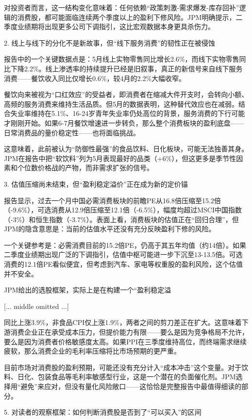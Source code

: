\documentclass[11pt]{ctexart}
\begin{document}
对投资者而言，这一结构变化意味着：任何依赖“政策刺激-需求爆发-库存回补”逻辑的消费股，都可能面临连续两个季度以上的盈利下修风险。JPM明确提示，二季度业绩期将出现更多公司下调指引，这比宏观数据本身更具杀伤力。

2. 线上与线下的分化不是新故事，但“线下服务消费”的韧性正在被侵蚀

报告中的一个关键数据点是：5月线上实物零售同比增长2.6\%，而线下实物零售同比下降2.2\%。线上渗透率的持续提升已经是旧叙事，真正的新信号来自线下服务消费——餐饮收入同比仅增长0.6\%，较4月的2.2\%大幅收窄。

餐饮向来被视为“口红效应”的受益者，即消费者在缩减大件开支时，会转向小额、高频的服务消费来维持生活品质。但5月的数据表明，这种替代效应也在减弱。结合失业率维持在5.1\%、16-24岁青年失业率仍处高位的背景，服务消费的下行可能才刚刚开始。如果6-7月餐饮增速进一步转负，那么整个消费板块的盈利底盘——日常消费品的量价稳定性——也将面临挑战。

这意味着，此前被认为“防御性最强”的食品饮料、日化板块，可能无法独善其身。JPM在报告中把“软饮料”列为5月表现最好的品类（+6\%），但这更多是季节性因素和个位数价格战的产物，而非需求扩张的信号。

3. 估值压缩尚未结束，但“盈利稳定溢价”正在成为新的定价锚

报告显示，过去一个月中国必需消费板块的前瞻PE从16.8倍压缩至15.2倍（-9.6\%），可选消费从12.9倍压缩至12.1倍（-6.5\%），幅度均超过MSCI中国指数（-3\%）和恒生指数（-3.7\%）。表面上看，消费板块的估值正在“回归合理”，但JPM的隐含意思是：当前的估值水平还没有充分反映盈利下修的风险。

一个关键参考是：必需消费目前的15.2倍PE，仍高于其五年均值（约14倍）。如果二季度业绩期出现广泛的下调指引，估值中枢可能进一步下沉至13-13.5倍。可选消费的12.1倍PE看似便宜，但考虑到汽车、家电等权重股的盈利风险，这个估值并不安全。

JPM给出的选股框架，实际上是在构建一个“盈利稳定溢

[... middle omitted ...]

同比上涨3.9\%，非食品CPI仅上涨1.9\%，两者之间的剪刀差正在扩大。这意味着下游消费企业正在承受成本压力，但提价能力有限——要么是因为竞争格局不允许，要么是因为消费者价格敏感度太高。如果PPI在三季度维持高位，而终端需求继续疲软，那么消费企业的毛利率压缩将比市场预期的更严重。

目前市场对消费股的盈利预期，可能还没有充分计入“成本冲击”这个变量。对于饮料、日化、包装食品等毛利率敏感型行业，这是一个潜在的负面催化剂。JPM选择用“避免”来应对，但没有量化风险敞口——这恰恰是完整报告中最值得细读的部分。

5. 对读者的观察框架：如何判断消费股是否到了“可以买入”的区间
\end{document}
